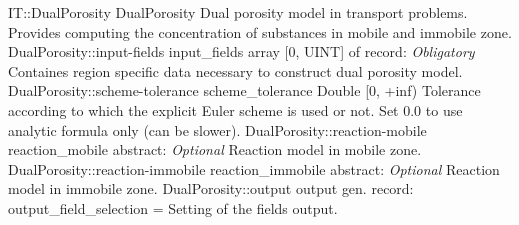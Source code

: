 \begin{RecordType}
	{IT::DualPorosity}
	{DualPorosity}
	{}%
	{}%
	{{{Dual porosity model in transport problems.}\\{
Provides computing the concentration of substances in mobile and immobile zone.}%
}}
		\RecKey
			{DualPorosity::input-fields}
			{input{\_}fields}
			{{array [0, UINT] of }{record: }}{}
			{ \it{Obligatory}}
			{{{Containes region specific data necessary to construct dual porosity model.}%
}}
		\RecKey
			{DualPorosity::scheme-tolerance}
			{scheme{\_}tolerance}
			{{Double [0, +inf)}}{}
			{ }
			{{{Tolerance according to which the explicit Euler scheme is used or not.
Set 0.0 to use analytic formula only (can be slower).}%
}}
		\RecKey
			{DualPorosity::reaction-mobile}
			{reaction{\_}mobile}
			{{abstract: }}{}
			{ \it{Optional}}
			{{{Reaction model in mobile zone.}%
}}
		\RecKey
			{DualPorosity::reaction-immobile}
			{reaction{\_}immobile}
			{{abstract: }}{}
			{ \it{Optional}}
			{{{Reaction model in immobile zone.}%
}}
		\RecKey
			{DualPorosity::output}
			{output}
			{{gen. record: }}{{output{\_}field{\_}selection}{ = }}
			{ }
			{{{Setting of the fields output.}%
}}
\end{RecordType}
